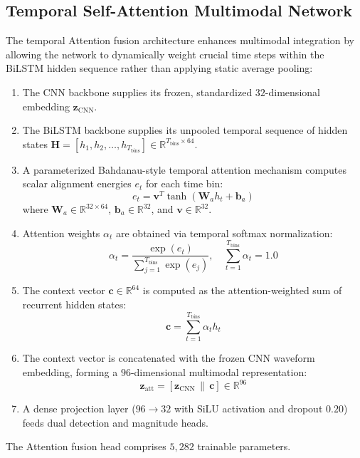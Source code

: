 \documentclass[journal]{IEEEtran}
\begin{document}
\subsection{Temporal Self-Attention Multimodal Network}
The temporal Attention fusion architecture enhances multimodal integration by allowing the network to dynamically weight crucial time steps within the BiLSTM hidden sequence rather than applying static average pooling:
\begin{enumerate}
    \item The CNN backbone supplies its frozen, standardized $32$-dimensional embedding $\mathbf{z}_{\text{CNN}}$.
    \item The BiLSTM backbone supplies its unpooled temporal sequence of hidden states $\mathbf{H} = [h_1, h_2, \dots, h_{T_{\text{bins}}}] \in \mathbb{R}^{T_{\text{bins}} \times 64}$.
    \item A parameterized Bahdanau-style temporal attention mechanism computes scalar alignment energies $e_t$ for each time bin:
    \begin{equation}
    e_t = \mathbf{v}^T \tanh(\mathbf{W}_a h_t + \mathbf{b}_a)
    \label{eq:attention_energy}
    \end{equation}
    where $\mathbf{W}_a \in \mathbb{R}^{32 \times 64}$, $\mathbf{b}_a \in \mathbb{R}^{32}$, and $\mathbf{v} \in \mathbb{R}^{32}$.
    \item Attention weights $\alpha_t$ are obtained via temporal softmax normalization:
    \begin{equation}
    \alpha_t = \frac{\exp(e_t)}{\sum_{j=1}^{T_{\text{bins}}} \exp(e_j)}, \quad \sum_{t=1}^{T_{\text{bins}}} \alpha_t = 1.0
    \label{eq:attention_softmax}
    \end{equation}
    \item The context vector $\mathbf{c} \in \mathbb{R}^{64}$ is computed as the attention-weighted sum of recurrent hidden states:
    \begin{equation}
    \mathbf{c} = \sum_{t=1}^{T_{\text{bins}}} \alpha_t h_t
    \label{eq:context_vector}
    \end{equation}
    \item The context vector is concatenated with the frozen CNN waveform embedding, forming a $96$-dimensional multimodal representation:
    \begin{equation}
    \mathbf{z}_{\text{att}} = [\mathbf{z}_{\text{CNN}} \,\|\, \mathbf{c}] \in \mathbb{R}^{96}
    \label{eq:att_concat}
    \end{equation}
    \item A dense projection layer ($96 \to 32$ with SiLU activation and dropout $0.20$) feeds dual detection and magnitude heads.
\end{enumerate}
The Attention fusion head comprises $5,282$ trainable parameters.
\end{document}
